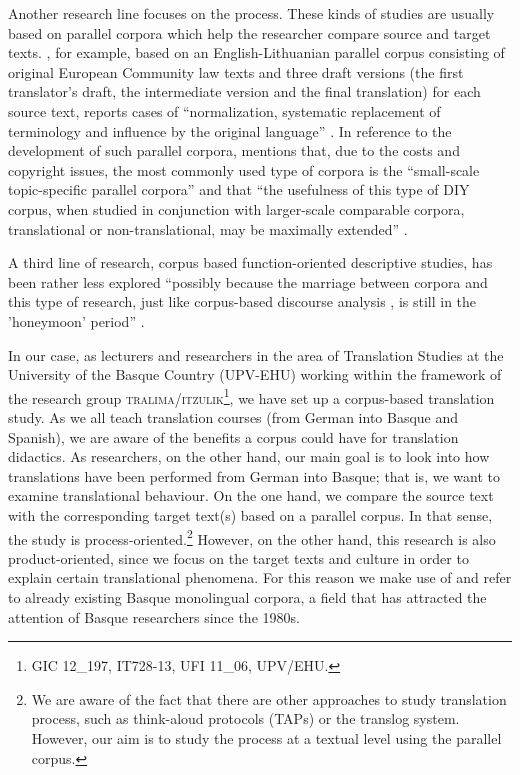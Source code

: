 \documentclass[output=paper]{LSP/langsci}
\begin{document}
Another research line focuses on the process. These kinds of studies are usually based on parallel corpora which help the researcher compare source and target texts. \citet{Utka2004}, for example, based on an English-Lithuanian parallel corpus consisting of original European Community law texts and three draft versions (the first translator's draft, the intermediate version and the final translation) for each source text, reports cases of “normalization, systematic replacement of terminology and influence by the original language” \citep[246]{Xiao2009}. In reference to the development of such parallel corpora, \citet{Ji2010} mentions that, due to the costs and copyright issues, the most commonly used type of corpora is the “small-scale topic-specific parallel corpora” \citep[6]{Ji2010} and that “the usefulness of this type of DIY corpus, when studied in conjunction with larger-scale comparable corpora, translational or non-translational, may be maximally extended” \citep[6]{Ji2010}.

A third line of research, corpus based function-oriented descriptive studies, has been rather less explored “possibly because the marriage between corpora and this type of research, just like corpus-based discourse analysis \citep[e.g.][]{Baker2006}, is still in the 'honeymoon' period” \citep[247]{Xiao2009}.

In our case, as lecturers and researchers in the area of Translation Studies at the University of the Basque Country (UPV-EHU) working within the framework of the research group \textsc{tralima}/\textsc{itzulik}\footnote{GIC 12\_197, IT728-13, UFI 11\_06, UPV/EHU.}, we have set up a corpus-based translation study. As we all teach translation courses (from German into Basque and Spanish), we are aware of the benefits a corpus could have for translation didactics. As researchers, on the other hand, our main goal is to look into how translations have been performed from German into Basque; that is, we want to examine translational behaviour. On the one hand, we compare the source text with the corresponding target text(s) based on a parallel corpus. In that sense, the study is process-oriented.\footnote{We are aware of the fact that there are other approaches to study translation process, such as think-aloud protocols (TAPs) or the translog system. However, our aim is to study the process at a textual level using the parallel corpus.} However, on the other hand, this research is also product-oriented, since we focus on the target texts and culture in order to explain certain translational phenomena. For this reason we make use of and refer to already existing Basque monolingual corpora, a field that has attracted the attention of Basque researchers since the 1980s.
\end{document}
